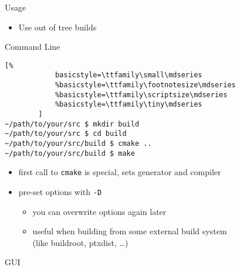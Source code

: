 \documentclass[t]{beamer}
\begin{document}
\begin{frame}[fragile]{Usage}
    \begin{itemize}
        \item Use out of tree builds
    \end{itemize}
    \begin{block}{Command Line}
        \begin{lstlisting}[%
            basicstyle=\ttfamily\small\mdseries
            %basicstyle=\ttfamily\footnotesize\mdseries
            %basicstyle=\ttfamily\scriptsize\mdseries
            %basicstyle=\ttfamily\tiny\mdseries
        ]
~/path/to/your/src $ mkdir build
~/path/to/your/src $ cd build
~/path/to/your/src/build $ cmake ..
~/path/to/your/src/build $ make
        \end{lstlisting}
    \end{block}
    \begin{itemize}
        \item first call to \texttt{cmake} is special, sets generator
            and compiler
        \item pre-set options with \texttt{-D}
            \begin{itemize}
                \item you can overwrite options again later
                \item useful when building from some external build
                    system\\(like buildroot, ptxdist, …)
            \end{itemize}
    \end{itemize}
\end{frame}

\begin{frame}{GUI}
\end{frame}
\end{document}
